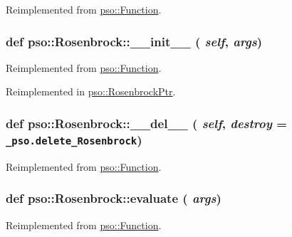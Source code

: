 Reimplemented from \hyperlink{classpso_1_1Function_959f07a6de4f333461fdb0261e6c25ae}{pso::Function}.\hypertarget{classpso_1_1Rosenbrock_10f77ae0f5c18274477e3102632b24f1}{
\subsubsection{\setlength{\rightskip}{0pt plus 5cm}def pso::Rosenbrock::\_\-\_\-init\_\-\_\- ( {\em self}, \/   {\em args})}}
\label{classpso_1_1Rosenbrock_10f77ae0f5c18274477e3102632b24f1}




Reimplemented from \hyperlink{classpso_1_1Function_6874097c6476dc85af64b40e76a807e9}{pso::Function}.

Reimplemented in \hyperlink{classpso_1_1RosenbrockPtr_cd5936c5a86eae090b9b9d473e6fa87c}{pso::RosenbrockPtr}.\hypertarget{classpso_1_1Rosenbrock_424c4c5cda5831c268442b97ea667618}{
\subsubsection{\setlength{\rightskip}{0pt plus 5cm}def pso::Rosenbrock::\_\-\_\-del\_\-\_\- ( {\em self}, \/   {\em destroy} = {\tt \_\-pso.delete\_\-Rosenbrock})}}
\label{classpso_1_1Rosenbrock_424c4c5cda5831c268442b97ea667618}




Reimplemented from \hyperlink{classpso_1_1Function_c80bd40fcf4a956e5732ed099bccc598}{pso::Function}.\hypertarget{classpso_1_1Rosenbrock_8609c7b4f2ca951920cfee0cb6fdacc4}{
\subsubsection{\setlength{\rightskip}{0pt plus 5cm}def pso::Rosenbrock::evaluate ( {\em args})}}
\label{classpso_1_1Rosenbrock_8609c7b4f2ca951920cfee0cb6fdacc4}




Reimplemented from \hyperlink{classpso_1_1Function_7c958ea6d942a89ae219b872b4d73541}{pso::Function}.

